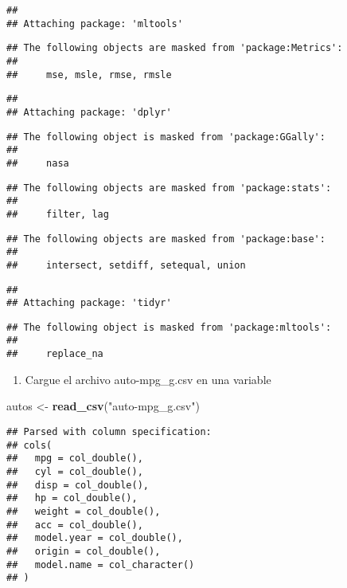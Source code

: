 \documentclass[]{article}
\newenvironment{Shaded}{\begin{snugshade}}{\end{snugshade}}
\newcommand{\KeywordTok}[1]{\textcolor[rgb]{0.13,0.29,0.53}{\textbf{#1}}}
\newcommand{\NormalTok}[1]{#1}
\newcommand{\StringTok}[1]{\textcolor[rgb]{0.31,0.60,0.02}{#1}}
\providecommand{\tightlist}{%
  \setlength{\itemsep}{0pt}\setlength{\parskip}{0pt}}
\begin{document}
\begin{verbatim}
## 
## Attaching package: 'mltools'
\end{verbatim}

\begin{verbatim}
## The following objects are masked from 'package:Metrics':
## 
##     mse, msle, rmse, rmsle
\end{verbatim}

\begin{verbatim}
## 
## Attaching package: 'dplyr'
\end{verbatim}

\begin{verbatim}
## The following object is masked from 'package:GGally':
## 
##     nasa
\end{verbatim}

\begin{verbatim}
## The following objects are masked from 'package:stats':
## 
##     filter, lag
\end{verbatim}

\begin{verbatim}
## The following objects are masked from 'package:base':
## 
##     intersect, setdiff, setequal, union
\end{verbatim}

\begin{verbatim}
## 
## Attaching package: 'tidyr'
\end{verbatim}

\begin{verbatim}
## The following object is masked from 'package:mltools':
## 
##     replace_na
\end{verbatim}

\begin{enumerate}
\def\labelenumi{\arabic{enumi}.}
\tightlist
\item
  Cargue el archivo auto-mpg\_g.csv en una variable
\end{enumerate}

\begin{Shaded}
\begin{Highlighting}[]
\NormalTok{autos <-}\StringTok{ }\KeywordTok{read_csv}\NormalTok{(}\StringTok{"auto-mpg_g.csv"}\NormalTok{)}
\end{Highlighting}
\end{Shaded}

\begin{verbatim}
## Parsed with column specification:
## cols(
##   mpg = col_double(),
##   cyl = col_double(),
##   disp = col_double(),
##   hp = col_double(),
##   weight = col_double(),
##   acc = col_double(),
##   model.year = col_double(),
##   origin = col_double(),
##   model.name = col_character()
## )
\end{verbatim}
\end{document}
